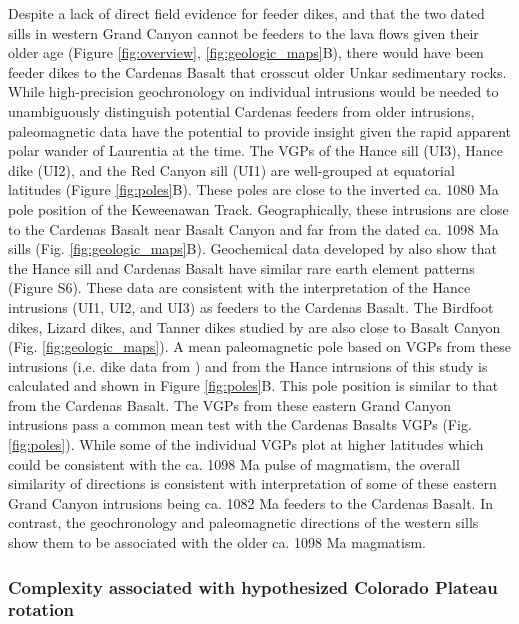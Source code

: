 Despite a lack of direct field evidence for feeder dikes, and that the two dated sills in western Grand Canyon cannot be feeders to the lava flows given their older age (Figure \ref{fig:overview}, \ref{fig:geologic_maps}B), there would have been feeder dikes to the Cardenas Basalt that crosscut older Unkar sedimentary rocks. While high-precision geochronology on individual intrusions would be needed to unambiguously distinguish potential Cardenas feeders from older intrusions, paleomagnetic data have the potential to provide insight given the rapid apparent polar wander of Laurentia at the time. The VGPs of the Hance sill (UI3), Hance dike (UI2), and the Red Canyon sill (UI1) are well-grouped at equatorial latitudes (Figure \ref{fig:poles}B). These poles are close to the inverted ca. 1080 Ma pole position of the Keweenawan Track. Geographically, these intrusions are close to the Cardenas Basalt near Basalt Canyon and far from the dated ca. 1098 Ma sills (Fig. \ref{fig:geologic_maps}B). Geochemical data developed by  also show that the Hance sill and Cardenas Basalt have similar rare earth element patterns (Figure S6). These data are consistent with the interpretation of the Hance intrusions (UI1, UI2, and UI3) as feeders to the Cardenas Basalt. The Birdfoot dikes, Lizard dikes, and Tanner dikes studied by  are also close to Basalt Canyon (Fig. \ref{fig:geologic_maps}). A mean paleomagnetic pole based on VGPs from these intrusions (i.e. dike data from ) and from the Hance intrusions of this study is calculated and shown in Figure \ref{fig:poles}B. This pole position is similar to that from the Cardenas Basalt. The VGPs from these eastern Grand Canyon intrusions pass a common mean test with the Cardenas Basalts VGPs (Fig. \ref{fig:poles}). While some of the individual VGPs plot at higher latitudes which could be consistent
with the ca. 1098 Ma pulse of magmatism, the overall similarity of directions is consistent with interpretation of some of these eastern Grand Canyon intrusions being ca. 1082 Ma feeders to the Cardenas Basalt. In contrast, the geochronology and paleomagnetic directions of the western sills show them to be associated with the older ca. 1098 Ma magmatism. 

\subsubsection*{Complexity associated with hypothesized Colorado Plateau rotation}

